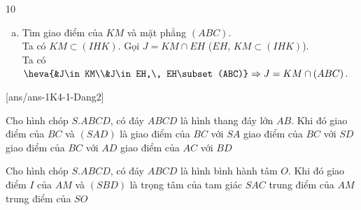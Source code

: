 \begin{indapan}{10}
\begin{bt}
{\begin{enumerate}[a)]
\begin{itemize}
				Khi đó: $\heva{&F\in BC\\&F\in EH, \, EH\subset (IHK)}\Rightarrow F=BC\cap (IHK)$.
			\end{itemize}
		\item Tìm giao điểm của $KM$ và mặt phẳng $(ABC)$.\\
			Ta có $KM\subset (IHK)$. Gọi $J=KM\cap EH$ ($ EH,\, KM\subset (IHK)$).\\
			Ta có $\heva{&J\in KM\\&J\in EH,\, EH\subset (ABC)}\Rightarrow J=KM\cap (ABC)$.
	\end{enumerate}
	}
\end{bt}

\centerline{}
[ans/ans-1K4-1-Dang2]
\begin{ex}%
	Cho hình chóp $S.ABCD$, có đáy $ABCD$ là hình thang đáy lớn $AB$. Khi đó giao điểm của $BC$ và $(SAD)$ là 
	\choice
	{giao điểm của $BC$ với $SA$}
	{giao điểm của $BC$ với $SD$}
	{\True giao điểm của $BC$ với $AD$}
	{giao điểm của $AC$ với $BD$}
\end{ex}
\begin{ex}%
	Cho hình chóp $S.ABCD$, có đáy $ABCD$ là hình bình hành tâm $O$. Khi đó giao điểm $I$ của $AM$ và $(SBD)$ là
	\choice
	{\True trọng tâm của tam giác $SAC$}
	{trung điểm của $AM$}
	{trung điểm của $SO$}

\end{ex}
\end{indapan}
